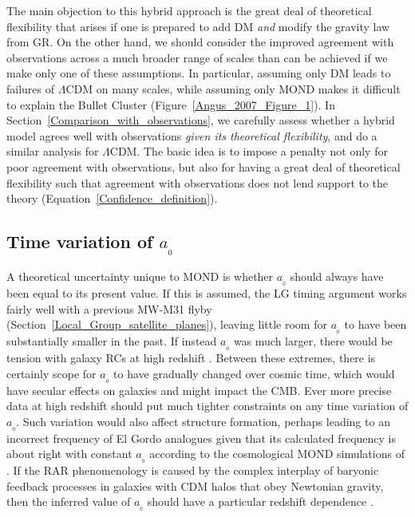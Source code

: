 \documentclass[fleqn,usenatbib,useAMS,onecolumn]{mnras} %
\begin{document}
The main objection to this hybrid approach is the great deal of theoretical flexibility that arises if one is prepared to add DM \emph{and} modify the gravity law from GR. On the other hand, we should consider the improved agreement with observations across a much broader range of scales than can be achieved if we make only one of these assumptions. In particular, assuming only DM leads to failures of $\Lambda$CDM on many scales, while assuming only MOND makes it difficult to explain the Bullet Cluster (Figure~\ref{Angus_2007_Figure_1}). In Section~\ref{Comparison_with_observations}, we carefully assess whether a hybrid model agrees well with observations \emph{given its theoretical flexibility}, and do a similar analysis for $\Lambda$CDM. The basic idea is to impose a penalty not only for poor agreement with observations, but also for having a great deal of theoretical flexibility such that agreement with observations does not lend support to the theory (Equation~\ref{Confidence_definition}).



\subsection{Time variation of $a_{_0}$}
\label{a0_variation}

A theoretical uncertainty unique to MOND is whether $a_{_0}$ should always have been equal to its present value. If this is assumed, the LG timing argument works fairly well with a previous MW-M31 flyby (Section~\ref{Local_Group_satellite_planes}), leaving little room for $a_{_0}$ to have been substantially smaller in the past. If instead $a_{_0}$ was much larger, there would be tension with galaxy RCs at high redshift \citep{Milgrom_2017}. Between these extremes, there is certainly scope for $a_{_0}$ to have gradually changed over cosmic time, which would have secular effects on galaxies \citep{Milgrom_2015_secular} and might impact the CMB. Ever more precise data at high redshift \citep[e.g.][]{Lelli_2021} should put much tighter constraints on any time variation of $a_{_0}$. Such variation would also affect structure formation, perhaps leading to an incorrect frequency of El Gordo analogues given that its calculated frequency is about right with constant $a_{_0}$ \citep{Asencio_2021} according to the cosmological MOND simulations of \citet{Katz_2013}. If the RAR phenomenology is caused by the complex interplay of baryonic feedback processes in galaxies with CDM halos that obey Newtonian gravity, then the inferred value of $a_{_0}$ should have a particular redshift dependence \citep{Garaldi_2018}.
\end{document}
